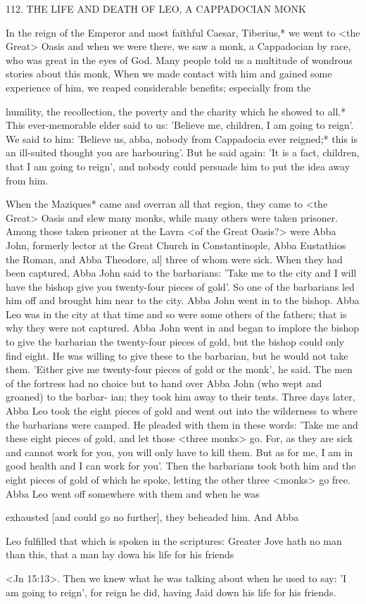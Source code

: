 112.
THE LIFE AND DEATH OF LEO,
A CAPPADOCIAN MONK

In the reign of the Emperor and most faithful Caesar, Tiberius,* we
went to <the Great> Oasis and when we were there, we saw a
monk, a Cappadocian by race, who was great in the eyes of God.
Many people told us a multitude of wondrous stories about this
monk, When we made contact with him and gained some experience
of him, we reaped considerable benefits; especially from the

humility, the recollection, the poverty and the charity which he
showed to all.* This ever-memorable elder said to us: 'Believe me,
children, I am going to reign'.
We said to him: 'Believe us, abba,
nobody from Cappadocia ever reigned;* this is an ill-suited thought
you are harbouring'.
But he said again: 'It is a fact, children, that
I am going to reign', and nobody could persuade him to put the
idea away from him.

When the Maziques* came and overran all that region, they
came to <the Great> Oasis and slew many monks, while many
others were taken prisoner.
Among those taken prisoner at the
Lavra <of the Great Oasis?> were Abba John, formerly lector at the
Great Church in Constantinople, Abba Eustathios the Roman, and
Abba Theodore, al] three of whom were sick.
When they had been
captured, Abba John said to the barbarians: 'Take me to the city
and I will have the bishop give you twenty-four pieces of gold'.
So
one of the barbarians led him off and brought him near to the city.
Abba John went in to the bishop.
Abba Leo was in the city at that
time and so were some others of the fathers; that is why they were
not captured.
Abba John went in and began to implore the bishop
to give the barbarian the twenty-four pieces of gold, but the bishop
could only find eight.
He was willing to give these to the barbarian,
but he would not take them.
'Either give me twenty-four pieces of
gold or the monk', he said.
The men of the fortress had no choice
but to hand over Abba John (who wept and groaned) to the barbar-
ian; they took him away to their tents.
Three days later, Abba Leo
took the eight pieces of gold and went out into the wilderness to
where the barbarians were camped.
He pleaded with them in these
words: 'Take me and these eight pieces of gold, and let those <three
monks> go.
For, as they are sick and cannot work for you, you will
only have to kill them.
But as for me, I am in good health and I can
work for you'.
Then the barbarians took both him and the eight
pieces of gold of which he spoke, letting the other three <monks>
go free.
Abba Leo went off somewhere with them and when he was

exhausted [and could go no further], they beheaded him.
And Abba

Leo fulfilled that which is spoken in the scriptures: Greater Jove
hath no man than this, that a man lay dowa his life for his friends

<Jn 15:13>.
Then we knew what he was talking about when he used
to say: 'I am going to reign', for reign he did, having Jaid down his
life for his friends.


